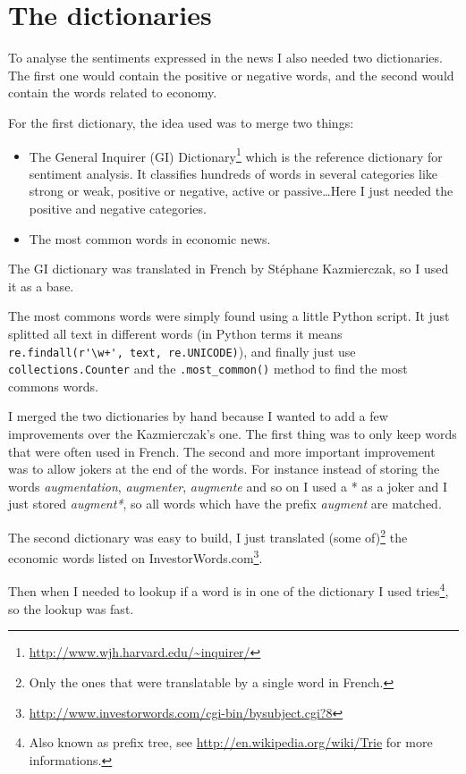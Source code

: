\documentclass[12pt]{report}
\begin{document}
		\section{The dictionaries}
		
			To analyse the sentiments expressed in the news I also needed two dictionaries. The first one would contain the positive or negative words, and the second would contain the words related to economy.
			
			For the first dictionary, the idea used was to merge two things:
			\begin{itemize}
				\item The General Inquirer (GI) Dictionary\footnote{\url{http://www.wjh.harvard.edu/~inquirer/}} which is the reference dictionary for sentiment analysis. It classifies hundreds of words in several categories like strong or weak, positive or negative, active or passive\ldots Here I just needed the positive and negative categories.
				\item The most common words in economic news.
			\end{itemize}
			
			The GI dictionary was translated in French by Stéphane Kazmierczak, so I used it as a base.
			
			The most commons words were simply found using a little Python script. It just splitted all text in different words (in Python terms it means \lstinline!re.findall(r'\w+', text, re.UNICODE)!), and finally just use \lstinline!collections.Counter! and the \lstinline!.most_common()! method to find the most commons words.
			
			I merged the two dictionaries by hand because I wanted to add a few improvements over the Kazmierczak's one. The first thing was to only keep words that were often used in French. The second and more important improvement was to allow jokers at the end of the words. For instance instead of storing the words \emph{augmentation}, \emph{augmenter}, \emph{augmente} and so on I used a * as a joker and I just stored \emph{augment*}, so all words which have the prefix \emph{augment} are matched.
			
			The second dictionary was easy to build, I just translated (some of)\footnote{Only the ones that were translatable by a single word in French.} the economic words listed on InvestorWords.com\footnote{\url{http://www.investorwords.com/cgi-bin/bysubject.cgi?8}}.
			
			Then when I needed to lookup if a word is in one of the dictionary I used tries\footnote{Also known as prefix tree, see \url{http://en.wikipedia.org/wiki/Trie} for more informations.}, so the lookup was fast.
			
\end{document}
